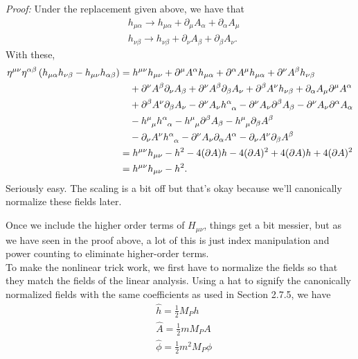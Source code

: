 \documentclass{book}
\theoremstyle{definition}
\newcommand{\p}{\partial}
\newcommand{\nn}{\nonumber}
\newcommand{\al}{\alpha}
\newcommand{\be}{\beta}
\newcommand{\f}[2]{\frac{#1}{#2}}
\newcommand{\lp}{\left(}
\newcommand{\rp}{\right)}
\begin{document}
\begin{framed}
	\textit{Proof:} 
	Under the replacement given above, we have that
	\begin{align}
	&h_{\mu\al} \to h_{\mu\al} + \p_\mu A_\al + \p_\al A_\mu \nn\\
	&h_{\nu\be} \to h_{\nu\be} + \p_\nu A_\be + \p_\be A_\nu.
	\end{align}
	With these, 
	\begin{align}
	\eta^{\mu\nu}\eta^{\al\be}\lp h_{\mu\al}h_{\nu\be} - h_{\mu\nu}h_{\al\be} \rp 
	&= h^{\mu\nu}h_{\mu\nu} + \p^\mu A^\al h_{\mu\al} + \p^\al A^\mu h_{\mu\al} + \p^\nu A^\be h_{\nu\be} \nn\\
	&\quad +\p^\nu A^\be \p_\nu A_\be + \p^\nu A^\be \p_\be A_\nu + \p^\be A^\nu h_{\nu\be} + \p_\al A_\mu \p^\mu A^\al  \nn\\
	&\quad + \p^\be A^\nu \p_\be A_\nu - \p^\nu A_\nu \tensor{h}{^\al_\al} - \p^\nu A_\nu \p^\be A_\be - \p^\nu A_\nu \p^\al A_\al \nn\\
	&\quad -\tensor{h}{^\mu_\mu}\tensor{h}{^\al_\al} - \tensor{h}{^\mu_\mu}\p^\be A_\be - \tensor{h}{^\mu_\mu}\p_\be A^\be \nn\\
	&\quad - \p_\nu A^\nu \tensor{h}{^\al_\al} - \p^\nu A_\nu \p_\al A^\al - \p_\nu A^\nu \p_\be A^\be\nn\\
	&= h^{\mu\nu}h_{\mu\nu} - h^2  -4(\p A)h - 4(\p A)^2 + 4(\p A)h + 4(\p A)^2\nn\\
	&= h^{\mu\nu}h_{\mu\nu} - h^2.
	\end{align}
	Seriously easy.  The scaling is a bit off but that's okay because we'll canonically normalize these fields later.
\end{framed}


Once we include the higher order terms of $H_{\mu\nu}$, things get a bit messier, but as we have seen in the proof above, a lot of this is just index manipulation and power counting to eliminate higher-order terms. \\

To make the nonlinear trick work, we first have to normalize the fields so that they match the fields of the linear analysis. Using a hat to signify the canonically normalized fields with the same coefficients as used in Section 2.7.5, we have
\begin{align}\label{canon}
&\hat{h} = \f{1}{2}M_P h\\
&\hat{A} = \f{1}{2}mM_P A\\
&\hat{\phi} = \f{1}{2}m^2 M_P \phi
\end{align}
\end{document}
